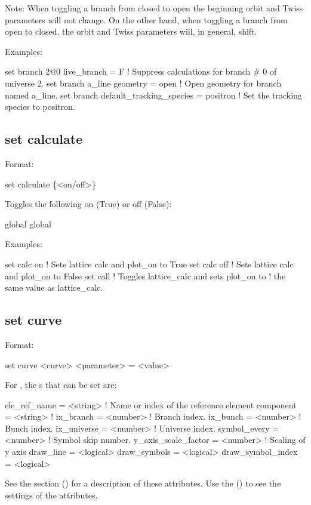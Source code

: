 {{Note: When toggling a branch from closed to open the beginning orbit and Twiss parameters will not
change. On the other hand, when toggling a branch from open to closed, the orbit and Twiss
parameters will, in general, shift.

Examples:
\begin{example}
  set branch 2@0 live_branch = F     ! Suppress calculations for branch \# 0 of universe 2.
  set branch a_line geometry = open  ! Open geometry for branch named a_line.
  set branch default_tracking_species = positron
                                     ! Set the tracking species to positron.
\end{example}


\subsection{set calculate}
\label{s:set.calc}

Format:
\begin{example}
  set calculate \{<on/off>\}
\end{example}

Toggles the following on (True) or off (False):
\begin{example}
  global%
  global%
\end{example}

Examples:
\begin{example}
  set calc on    ! Sets lattice calc and plot_on to True
  set calc off   ! Sets lattice calc and plot_on to False
  set call       ! Toggles lattice_calc and sets plot_on to
                 !  the same value as lattice_calc.
\end{example}


\subsection{set curve}
\label{s:set.curve}

Format:
\begin{example}
  set curve <curve> <parameter> = <value>
\end{example}

For , the s that can be set are:
\begin{example}
  ele_ref_name        = <string>  ! Name or index of the reference element
  component           = <string>  ! 
  ix_branch           = <number>  ! Branch index.
  ix_bunch            = <number>  ! Bunch index.
  ix_universe         = <number>  ! Universe index.
  symbol_every        = <number>  ! Symbol skip number.
  y_axis_scale_factor = <number>  ! Scaling of y axis
  draw_line           = <logical> 
  draw_symbols        = <logical> 
  draw_symbol_index   = <logical> 
\end{example}
See the  section () for a description of these attributes.  Use
the  () to see the settings of the attributes.

}}
